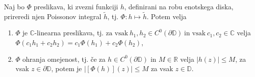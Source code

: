 \documentclass[mat1, tisk]{fmfdelo}
\begin{document}
     \begin{trditev}
        \label{lastpi}
        Naj bo $\Phi$ preslikava, ki zvezni funkciji $h$, definirani na robu enotskega diska, prireredi njen Poissonov integral $\widetilde{h}$, tj. $\Phi : h \mapsto \widetilde{h}$.
        Potem velja
        \begin{enumerate}[label={\alph*)}]
            \item $\Phi$ je $\mathbb{C}$-linearna preslikava, tj. \mbox{$\text{za vsak}~h_1,h_2 \in C^0(\partial \mathbb{D})~\text{in vsak}~c_1,c_2 \in \mathbb{C}$} velja $\Phi(c_1 h_1 + c_2 h_2) = c_1 \Phi(h_1) + c_2 \Phi(h_2)$,
            \item $\Phi$ ohranja omejenost, tj. če za $h \in C^0(\partial \mathbb{D})$ in $M \in \mathbb{R}$ velja $|h(z)| \leq M$, za vsak $z \in \partial \mathbb{D}$, potem je $|[\Phi(h)](z)| \leq M$ za vsak $z \in \mathbb{D}$.
        \end{enumerate}
     \end{trditev}
\end{document}

